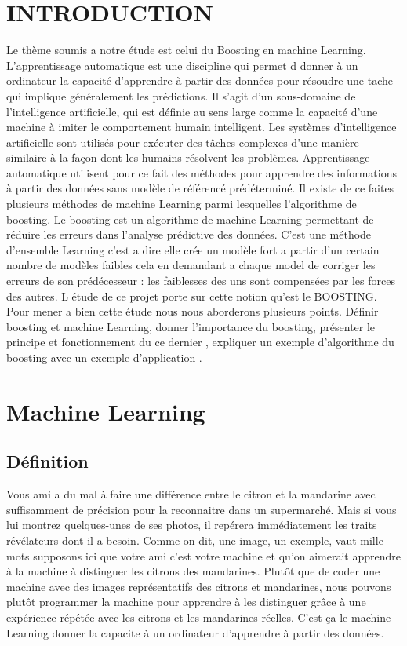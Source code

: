 \documentclass[french,a4paper,12pt]{article}
\begin{document}
 \begin{center}
 \tableofcontents
 \end{center}
\newpage



\section{INTRODUCTION}
\quad Le thème soumis a notre étude est celui du Boosting en machine Learning. L’apprentissage automatique est une discipline qui permet d donner à un ordinateur la capacité d’apprendre à partir des données pour résoudre une tache qui implique généralement les prédictions. Il s’agit d’un sous-domaine de l'intelligence artificielle, qui est définie au sens large comme la capacité d'une machine à imiter le comportement humain intelligent. Les systèmes d'intelligence artificielle sont utilisés pour exécuter des tâches complexes d'une manière similaire à la façon dont les humains résolvent les problèmes. Apprentissage automatique utilisent pour ce fait des méthodes pour apprendre des informations à partir des données sans modèle de référencé prédéterminé. Il existe de ce faites plusieurs méthodes de machine Learning parmi lesquelles l’algorithme de boosting. Le boosting est un algorithme de machine Learning permettant de réduire les erreurs dans l’analyse prédictive des données. C’est une méthode d’ensemble Learning c’est a dire elle crée un modèle fort a partir d’un certain nombre de modèles faibles cela en demandant a chaque model de corriger les erreurs de son prédécesseur : les faiblesses des uns sont compensées par les forces des autres. L étude de ce projet porte sur cette notion qu’est le BOOSTING. Pour mener a bien cette étude nous nous aborderons plusieurs points. Définir boosting et machine Learning, donner l’importance du boosting, présenter le principe et fonctionnement du ce dernier , expliquer un exemple d’algorithme du boosting avec un exemple d’application . 




\newpage
\section{Machine Learning}
\subsection{Définition}
\quad Vous ami a du mal à faire une différence entre le citron et la mandarine avec suffisamment de précision pour la reconnaitre dans un supermarché. Mais si vous lui montrez quelques-unes de ses photos, il repérera immédiatement les traits révélateurs dont il a besoin. Comme on dit, une image, un exemple, vaut mille mots supposons ici que votre ami c’est votre machine et qu’on aimerait apprendre à la machine à distinguer les citrons des mandarines. Plutôt que de coder une machine avec des images représentatifs des citrons et mandarines, nous pouvons plutôt programmer la machine pour apprendre à les distinguer grâce à une expérience répétée avec les citrons et les mandarines réelles. C’est ça le machine Learning donner la capacite à un ordinateur d’apprendre à partir des données.
\end{document}
